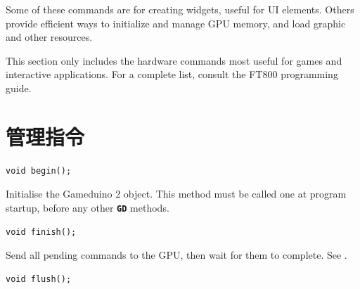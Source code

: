 \documentclass[10pt]{book}
\makeatletter
\newcommand{\gdtwo}{Gameduino 2 }
\newcommand{\mach}[1]{\texttt{\textbf{#1}}}
\newcommand{\cmdidx}[1]{
\index{#1@\mach{#1()}}
}
\newcommand{\cmd}[1]{\cmdidx{cmd\_#1}\nameref{cmd:#1}}
\makeatother
\begin{document}
\begin{CJK}{UTF8}{gkai}
Some of these commands 
are for creating widgets, useful for UI elements.
Others provide efficient ways to initialize and manage GPU memory,
and load graphic and other resources.

This section only includes the hardware commands
most useful for games and interactive applications.
For a complete list, consult the FT800 programming guide.

\newcommand{\highcmd}[2]{
\section{\texttt{cmd\_#1}}
\label{cmd:#1}
\index{cmd\_#1@\mach{cmd\_#1()}|boldindex}
}




\chapter{管理指令}


\begin{framed}
\begin{verbatim}
void begin();
\end{verbatim}
\end{framed}

Initialise the \gdtwo object.
This method must be called one at program startup, before any other \mach{GD} methods.


\begin{framed}
\begin{verbatim}
void finish();
\end{verbatim}
\end{framed}

Send all pending commands to the GPU, then wait for them to complete.
See .

\newpage
{}

\begin{framed}
\begin{verbatim}
void flush();
\end{verbatim}
\end{framed}


\end{CJK}
\end{document}
